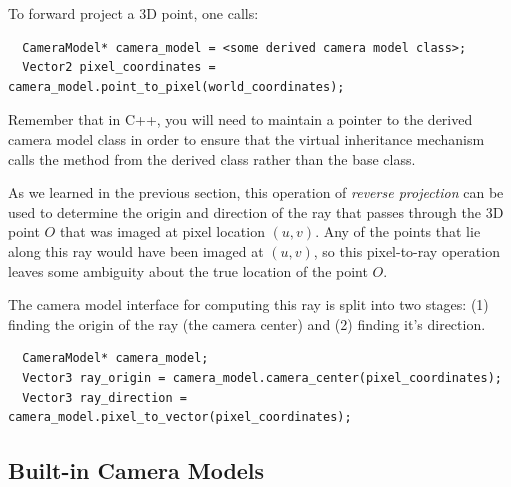 To forward project a 3D point, one calls:

\begin{verbatim}
  CameraModel* camera_model = <some derived camera model class>;  
  Vector2 pixel_coordinates = camera_model.point_to_pixel(world_coordinates);
\end{verbatim}

Remember that in C++, you will need to maintain a pointer to the
derived camera model class in order to ensure that the virtual
inheritance mechanism calls the method from the derived class rather
than the base class.

As we learned in the previous section, this operation of {\em reverse
  projection} can be used to determine the origin and direction of the
ray that passes through the 3D point $O$ that was imaged at pixel
location $(u,v)$.  Any of the points that lie along this ray would
have been imaged at $(u,v)$, so this pixel-to-ray operation leaves
some ambiguity about the true location of the point $O$.

The camera model interface for computing this ray is split into two
stages: (1) finding the origin of the ray (the camera center) and (2) finding
it's direction.

\begin{verbatim}
  CameraModel* camera_model;  
  Vector3 ray_origin = camera_model.camera_center(pixel_coordinates);
  Vector3 ray_direction = camera_model.pixel_to_vector(pixel_coordinates);
\end{verbatim}

\begin{center}
\end{center}

\subsection{Built-in Camera Models}

